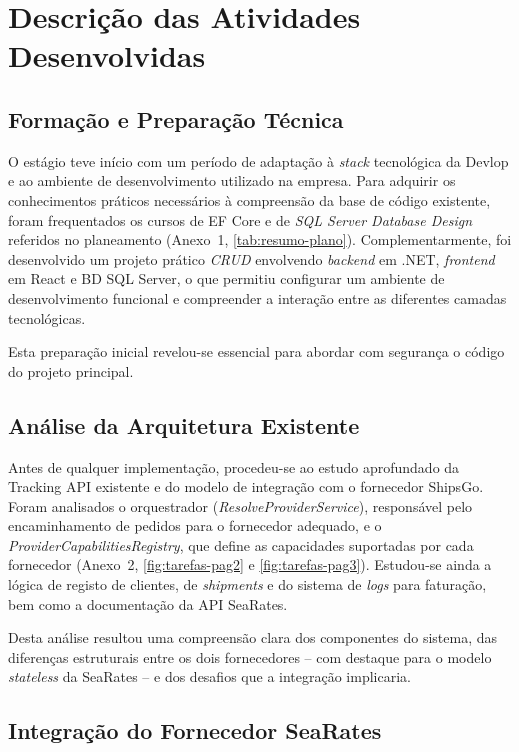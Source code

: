\documentclass[a4paper,12pt]{report}
\begin{document}
\chapter{Descrição das Atividades Desenvolvidas}

\section{Formação e Preparação Técnica}

O estágio teve início com um período de adaptação à \textit{stack} tecnológica da Devlop e ao ambiente de desenvolvimento utilizado na empresa. Para adquirir os conhecimentos práticos necessários à compreensão da base de código existente, foram frequentados os cursos de EF Core e de \textit{SQL Server Database Design} referidos no planeamento (Anexo~1, \autoref{tab:resumo-plano}). Complementarmente, foi desenvolvido um projeto prático \textit{CRUD} envolvendo \textit{backend} em .NET, \textit{frontend} em React e BD SQL Server, o que permitiu configurar um ambiente de desenvolvimento funcional e compreender a interação entre as diferentes camadas tecnológicas.

Esta preparação inicial revelou-se essencial para abordar com segurança o código do projeto principal.

\section{Análise da Arquitetura Existente}

Antes de qualquer implementação, procedeu-se ao estudo aprofundado da Tracking API existente e do modelo de integração com o fornecedor ShipsGo. Foram analisados o orquestrador (\textit{ResolveProviderService}), responsável pelo encaminhamento de pedidos para o fornecedor adequado, e o \textit{ProviderCapabilitiesRegistry}, que define as capacidades suportadas por cada fornecedor (Anexo~2, \autoref{fig:tarefas-pag2} e \autoref{fig:tarefas-pag3}). Estudou-se ainda a lógica de registo de clientes, de \textit{shipments} e do sistema de \textit{logs} para faturação, bem como a documentação da API SeaRates.

Desta análise resultou uma compreensão clara dos componentes do sistema, das diferenças estruturais entre os dois fornecedores -- com destaque para o modelo \textit{stateless} da SeaRates -- e dos desafios que a integração implicaria.

\section{Integração do Fornecedor SeaRates}
\end{document}

